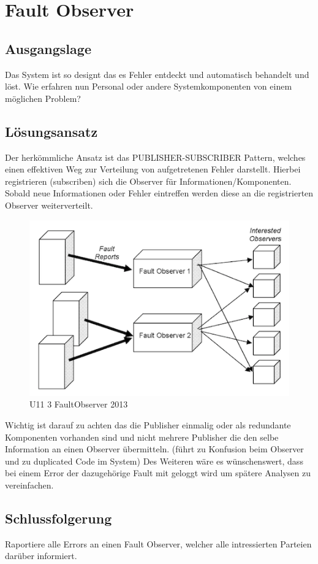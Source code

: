 
\section{Fault Observer}

\subsection{Ausgangslage}

Das System ist so designt das es Fehler entdeckt und automatisch behandelt und löst. Wie erfahren nun Personal oder andere Systemkomponenten von einem möglichen Problem?

\subsection{Lösungsansatz}

Der herkömmliche Ansatz ist das PUBLISHER-SUBSCRIBER Pattern, welches einen effektiven Weg zur Verteilung von aufgetretenen Fehler darstellt. Hierbei registrieren (subscriben) sich die Observer für Informationen/Komponenten. Sobald neue Informationen oder Fehler eintreffen werden diese an die registrierten Observer weiterverteilt.

\begin{figure}[H]
	\centering
	\includegraphics[width=\textwidth]{content/faulttolerance/images/U11_3_FaultObserver_2013.png}
	\caption{U11 3 FaultObserver 2013}
\end{figure}


Wichtig ist darauf zu achten das die Publisher einmalig oder als redundante Komponenten vorhanden sind und nicht mehrere Publisher die den selbe Information an einen Observer übermitteln. (führt zu Konfusion beim Observer und zu duplicated Code im System) Des Weiteren wäre es wünschenswert, dass bei einem Error der dazugehörige Fault mit geloggt wird um spätere Analysen zu vereinfachen.

\subsection{Schlussfolgerung}

Raportiere alle Errors an einen Fault Observer, welcher alle intressierten Parteien darüber informiert.
